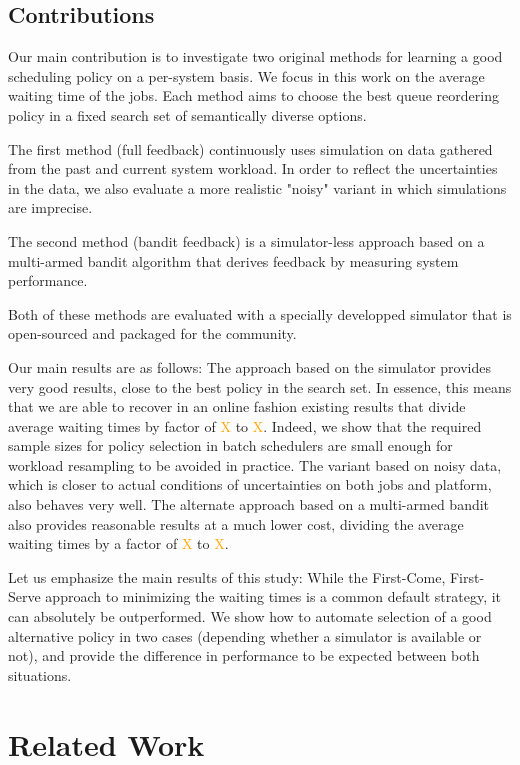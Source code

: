 \documentclass[sigconf,review,anonymous]{acmart}
\begin{document}
\subsection{Contributions}

Our main contribution is to investigate two original methods for learning a
good scheduling policy on a per-system basis. We focus in this work on the
average waiting time of the jobs. Each method aims to choose the best queue
reordering policy in a fixed search set of semantically diverse options.

The first method (full feedback) continuously uses simulation on data gathered
from the past and current system workload. In order to reflect the
uncertainties in the data, we also evaluate a more realistic "noisy" variant in
which simulations are imprecise.

The second method (bandit feedback) is a simulator-less approach based on a
multi-armed bandit algorithm that derives feedback by measuring system
performance.

Both of these methods are evaluated with a specially developped simulator that is
open-sourced and packaged for the community.


Our main results are as follows: The approach based on the simulator provides
very good results, close to the best policy in the search set. In essence, this
means that we are able to recover in an online fashion existing results that
divide average waiting times by factor of \textcolor{orange}{X} to
\textcolor{orange}{X}. Indeed, we show that the required sample sizes for
policy selection in batch schedulers are small enough for workload resampling to
be avoided in practice. The variant based on noisy data, which is closer to
actual conditions of uncertainties on both jobs and platform, also behaves very
well. The alternate approach based on a multi-armed bandit also provides
reasonable results at a much lower cost, dividing the average waiting times by
a factor of \textcolor{orange}{X} to \textcolor{orange}{X}.

Let us emphasize the main results of this study: While the First-Come,
First-Serve approach to minimizing the waiting times is a common default
strategy, it can absolutely be outperformed.  We show how to automate selection
of a good alternative policy in two cases (depending whether a simulator is
available or not), and provide the difference in performance to be expected
between both situations.

\section{Related Work}
\label{sec:rw}
\end{document}
